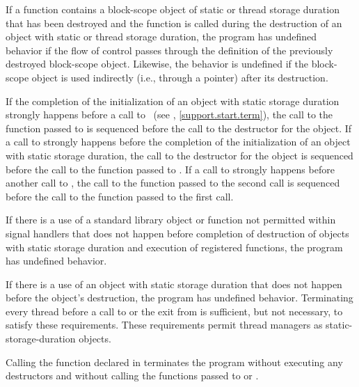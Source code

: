 \pnum
If a function contains a block-scope object of static or thread storage duration that has been
destroyed and the function is called during the destruction of an object with static or
thread storage duration, the program has undefined behavior if the flow of control
passes through the definition of the previously destroyed block-scope object. Likewise, the
behavior is undefined if the block-scope object is used indirectly (i.e., through a
pointer) after its destruction.

\pnum
{}%
%
If the completion of the initialization of an object with static storage
duration strongly happens before a call to ~(see
, \ref{support.start.term}), the call to the function passed to
 is sequenced before the call to the destructor for the object. If a
call to  strongly happens before the completion of the initialization of
an object with static storage duration, the call to the destructor for the
object is sequenced before the call to the function passed to . If a
call to  strongly happens before another call to , the
call to the function passed to the second  call is sequenced before
the call to the function passed to the first  call.

\pnum
If there is a use of a standard library object or function not permitted within signal
handlers that does not happen before
completion of destruction of objects with static storage duration and execution of
 registered functions, the program has
undefined behavior. \begin{note} If there is a use of an object with static storage
duration that does not happen before the object's destruction, the program has undefined
behavior. Terminating every thread before a call to  or the exit from
 is sufficient, but not necessary, to satisfy these requirements. These
requirements permit thread managers as static-storage-duration objects. \end{note}

\pnum
{}%
%
%
Calling the function  declared in
%
 terminates the program without executing any destructors
and without calling
the functions passed to  or .%

